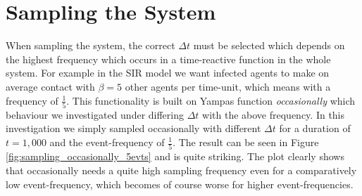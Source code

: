 \section{Sampling the System}
When sampling the system, the correct $\Delta t$ must be selected which depends on the highest frequency which occurs in a time-reactive function in the whole system. For example in the SIR model we want infected agents to make on average contact with $\beta = 5$ other agents per time-unit, which means with a frequency of $\frac{1}{5}$. This functionality is built on Yampas function \textit{occasionally} which behaviour we investigated under differing $\Delta t$ with the above frequency. In this investigation we simply sampled occasionally with different $\Delta t$ for a duration of $t = 1,000$ and the event-frequency of $\frac{1}{5}$. The result can be seen in Figure \ref{fig:sampling_occasionally_5evts} and is quite striking. The plot clearly shows that occasionally needs a quite high sampling frequency even for a comparatively low event-frequency, which becomes of course worse for higher event-frequencies.


